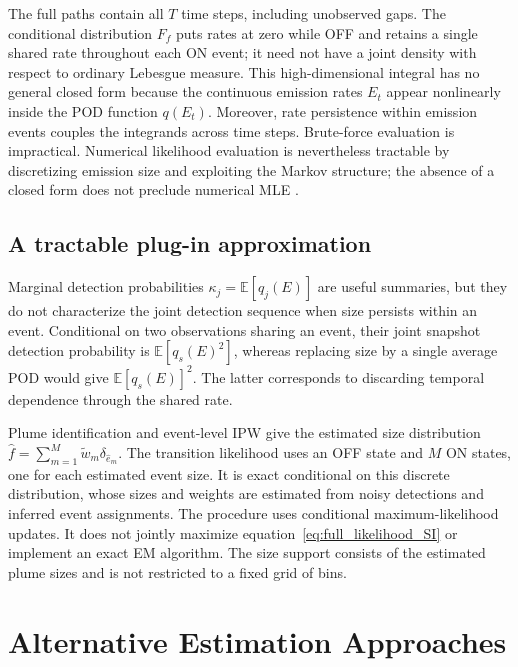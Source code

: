 \documentclass[11pt]{article}
\newcommand{\E}{\mathbb{E}}
\begin{document}
The full paths contain all $T$ time steps, including unobserved gaps. The conditional distribution $F_f$ puts rates at zero while OFF and retains a single shared rate throughout each ON event; it need not have a joint density with respect to ordinary Lebesgue measure. This high-dimensional integral has no general closed form because the continuous emission rates $E_t$ appear nonlinearly inside the POD function $q(E_t)$. Moreover, rate persistence within emission events couples the integrands across time steps. Brute-force evaluation is impractical. Numerical likelihood evaluation is nevertheless tractable by discretizing emission size and exploiting the Markov structure; the absence of a closed form does not preclude numerical MLE \citep{LangrockKing2013}.

\subsection{A tractable plug-in approximation}

Marginal detection probabilities $\kappa_j=\E[q_j(E)]$ are useful summaries, but they do not characterize the joint detection sequence when size persists within an event. Conditional on two observations sharing an event, their joint snapshot detection probability is $\E[q_s(E)^2]$, whereas replacing size by a single average POD would give $\E[q_s(E)]^2$. The latter corresponds to discarding temporal dependence through the shared rate.

Plume identification and event-level IPW give the estimated size distribution $\hat f=\sum_{m=1}^M\tilde w_m\delta_{\hat e_m}$. The transition likelihood uses an OFF state and $M$ ON states, one for each estimated event size. It is exact conditional on this discrete distribution, whose sizes and weights are estimated from noisy detections and inferred event assignments. The procedure uses conditional maximum-likelihood updates. It does not jointly maximize equation~\eqref{eq:full_likelihood_SI} or implement an exact EM algorithm. The size support consists of the estimated plume sizes and is not restricted to a fixed grid of bins.

\section{Alternative Estimation Approaches}
\label{sec:alternatives}
\end{document}
